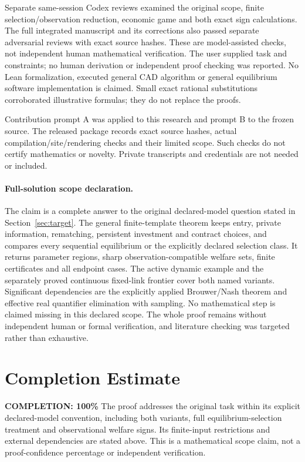 \documentclass[11pt,a4paper]{article}
\numberwithin{equation}{section}
\theoremstyle{definition}
\begin{document}
Separate same-session Codex reviews examined the original scope, finite
selection/observation reduction, economic game and both exact sign
calculations. The full integrated manuscript and its corrections also passed
separate adversarial reviews with exact source hashes. These are
model-assisted checks, not independent
human mathematical verification. The user supplied task and constraints;
no human derivation or independent proof checking was reported. No Lean
formalization, executed general CAD algorithm or general equilibrium
software implementation is claimed. Small exact rational substitutions
corroborated illustrative formulas; they do not replace the proofs.

Contribution prompt A was applied to this research and prompt B to
the frozen source. The released package records exact
source hashes, actual compilation/site/rendering checks and their limited
scope. Such checks do not certify mathematics or novelty. Private
transcripts and credentials are not needed or included.

\paragraph{Full-solution scope declaration.}
The claim is a complete answer to the original declared-model question
stated in Section~\ref{sec:target}. The general finite-template theorem
keeps entry, private information, rematching, persistent investment and
contract choices, and compares every sequential equilibrium or the
explicitly declared selection class. It returns parameter regions,
sharp observation-compatible welfare sets, finite certificates and all
endpoint cases. The active dynamic example and the separately proved
continuous fixed-link frontier cover both named variants.
Significant dependencies are the explicitly applied Brouwer/Nash theorem
and effective real quantifier elimination with sampling. No mathematical
step is claimed missing in this declared scope. The whole proof remains
without independent human or formal verification, and literature
checking was targeted rather than exhaustive.

\section{Completion Estimate}
\noindent\textbf{COMPLETION: 100\%}
The proof addresses the original task within its explicit declared-model
convention, including both variants, full equilibrium-selection treatment
and observational welfare signs. Its finite-input restrictions and
external dependencies are stated above. This is a mathematical scope
claim, not a proof-confidence percentage or independent verification.
\end{document}
